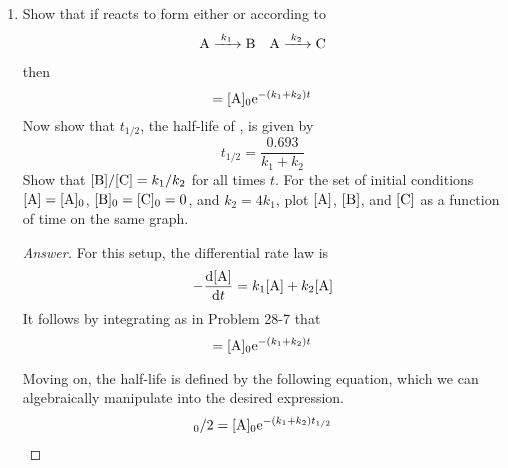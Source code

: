 \documentclass[../psets.tex]{subfiles}
\begin{document}
\begin{enumerate}[label={\textbf{28-\arabic*.}},leftmargin=3.5em]
\begin{proof}[Answer]
        Adapting the technique from Problem 28-10 developed for $m_{\ce{SCN-}}$, we have that
        \begin{equation*}
            m_{\ce{OCl-}} = \frac{\ln\left( \frac{v_1[\ce{OH-}]_1}{v_3[\ce{OH-}]_3} \right)}{\ln\left( \frac{[\ce{OCl-}]_1}{[\ce{OCl-}]_3} \right)}
                = 0.995 \approx 1
        \end{equation*}
        Thus, taking another linear regression inspired by the technique of Problem 28-10, we have that the final rate law is
        \begin{equation*}
            \boxed{v = 60.7\frac{[\ce{OCl-}][\ce{I-}]}{[\ce{OH-}]}}
        \end{equation*}
    \end{proof}
    \setcounter{enumi}{16}
    \item Show that if  reacts to form either  or  according to
    \begin{align*}
        \ce{A ->[$k_1$] B}&&
        \ce{A ->[$k_2$] C}
    \end{align*}
    then
    \begin{equation*}
        [\ce{A}] = [\ce{A}]_0\e[-(k_1+k_2)t]
    \end{equation*}
    Now show that $t_{1/2}$, the half-life of , is given by
    \begin{equation*}
        t_{1/2} = \frac{0.693}{k_1+k_2}
    \end{equation*}
    Show that $[\ce{B}]/[\ce{C}]=k_1/k_2$ for all times $t$. For the set of initial conditions $[\ce{A}]=[\ce{A}]_0$, $[\ce{B}]_0=[\ce{C}]_0=0$, and $k_2=4k_1$, plot $[\ce{A}]$, $[\ce{B}]$, and $[\ce{C}]$ as a function of time on the same graph.
    \begin{proof}[Answer]
        For this setup, the differential rate law is
        \begin{equation*}
            -\dv{[\ce{A}]}{t} = k_1[\ce{A}]+k_2[\ce{A}]
        \end{equation*}
        It follows by integrating as in Problem 28-7 that
        \begin{equation*}
            [\ce{A}] = [\ce{A}]_0\e[-(k_1+k_2)t]
        \end{equation*}\par
        Moving on, the half-life is defined by the following equation, which we can algebraically manipulate into the desired expression.
        \begin{align*}
            [\ce{A}]_0/2 &= [\ce{A}]_0\e[-(k_1+k_2)t_{1/2}]\\

\end{align*}
\end{proof}
\end{enumerate}
\end{document}
